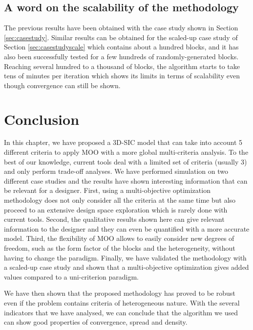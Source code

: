 \subsection{A word on the scalability of the methodology}
The previous results have been obtained with the case study shown in Section \ref{sec:casestudy}. Similar results can be obtained for the scaled-up case study of Section \ref{sec:casestudyscale} which contains about a hundred blocks, and it has also been successfully tested for a few hundreds of randomly-generated blocks. Reaching several hundred to a thousand of blocks, the algorithm starts to take tens of minutes per iteration which shows its limits in terms of scalability even though convergence can still be shown.

\section{Conclusion}

In this chapter, we have proposed a 3D-SIC model that can take into account 5 different criteria to apply MOO with a more global multi-criteria analysis. To the best of our knowledge, current tools deal with a limited set of criteria (usually 3) and only perform trade-off analyses. We have performed simulation on two different case studies and the results have shown interesting information that can be relevant for a designer. First, using a multi-objective optimization methodology does not only consider all the criteria at the same time but also proceed to an extensive design space exploration which is rarely done with current tools. Second, the qualitative results shown here can give relevant information to the designer and they can even be quantified with a more accurate model. Third, the flexibility of MOO allows to easily consider new degrees of freedom, such as the form factor of the blocks and the heterogeneity, without having to change the paradigm. Finally, we have validated the methodology with a scaled-up case study and shown that a multi-objective optimization gives added values compared to a uni-criterion paradigm.

We have then shown that the proposed methodology has proved to be robust even if the problem contains criteria of heterogeneous nature. With the several indicators that we have analysed, we can conclude that the algorithm we used can show good properties of convergence, spread and density.

